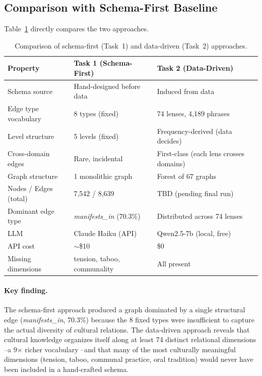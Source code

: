 \documentclass[11pt]{article}
\begin{document}
\subsection{Comparison with Schema-First Baseline}

Table~\ref{tab:comparison} directly compares the two approaches.

\begin{table}[t]
\centering
\small
\begin{tabular}{lll}
\toprule
\textbf{Property} & \textbf{Task 1 (Schema-First)} & \textbf{Task 2 (Data-Driven)} \\
\midrule
Schema source         & Hand-designed before data     & Induced from data \\
Edge type vocabulary  & 8 types (fixed)               & 74 lenses, 4,189 phrases \\
Level structure       & 5 levels (fixed)              & Frequency-derived (data decides) \\
Cross-domain edges    & Rare, incidental              & First-class (each lens crosses domains) \\
Graph structure       & 1 monolithic graph            & Forest of 67 graphs \\
Nodes / Edges (total) & 7,542 / 8,639                 & TBD (pending final run) \\
Dominant edge type    & \emph{manifests\_in} (70.3\%) & Distributed across 74 lenses \\
LLM                   & Claude Haiku (API)            & Qwen2.5-7b (local, free) \\
API cost              & $\sim$\$10                    & \$0 \\
Missing dimensions    & tension, taboo, communality   & All present \\
\bottomrule
\end{tabular}
\caption{Comparison of schema-first (Task~1) and data-driven (Task~2) approaches.}
\label{tab:comparison}
\end{table}

\paragraph{Key finding.}
The schema-first approach produced a graph dominated by a single structural
edge (\emph{manifests\_in}, 70.3\%) because the 8 fixed types were
insufficient to capture the actual diversity of cultural relations.
The data-driven approach reveals that cultural knowledge organizes itself
along at least 74 distinct relational dimensions --a 9$\times$ richer
vocabulary --and that many of the most culturally meaningful dimensions
(tension, taboo, communal practice, oral tradition) would never have been
included in a hand-crafted schema.
\end{document}
